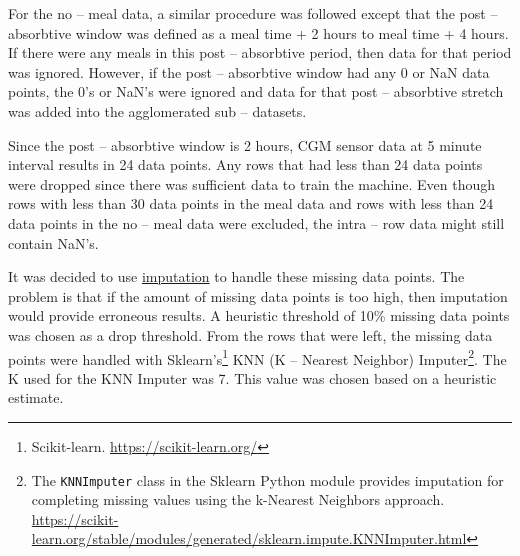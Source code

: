 For the no -- meal data, a similar procedure was followed except that the post -- absorbtive window was defined as a meal time + 2 hours to meal time + 4 hours.  If there were any meals in this post -- absorbtive period, then data for that period was ignored.  However, if the post -- absorbtive window had any 0 or NaN data points, the 0's or NaN's were ignored and data for that post -- absorbtive stretch was added into the agglomerated sub -- datasets.

Since the post -- absorbtive window is 2 hours, CGM sensor data at 5 minute interval results in 24 data points.  Any rows that had less than 24 data points were dropped since there was sufficient data to train the machine.
Even though rows with less than 30 data points in the meal data and rows with less than 24 data points in the no -- meal data were excluded, the intra -- row data might still contain NaN's.

It was decided to use \href{https://grokipedia.com/page/Imputation\_(statistics)}{imputation} to handle these missing data points.  The problem is that if the amount of missing data points is too high, then imputation would provide erroneous results.  A heuristic threshold of 10\% missing data points was chosen as a drop threshold.  From the rows that were left, the missing data points were handled with Sklearn's\footnote{Scikit-learn. \href{https://scikit-learn.org/}{https://scikit-learn.org/}} KNN (K -- Nearest Neighbor) Imputer\footnote{The \texttt{KNNImputer} class in the Sklearn Python module provides imputation for completing missing values using the k-Nearest Neighbors approach. \href{https://scikit-learn.org/stable/modules/generated/sklearn.impute.KNNImputer.html}{https://scikit-learn.org/stable/modules/generated/sklearn.impute.KNNImputer.html}}.  The K used for the KNN Imputer was 7.  This value was chosen based on a heuristic estimate.

